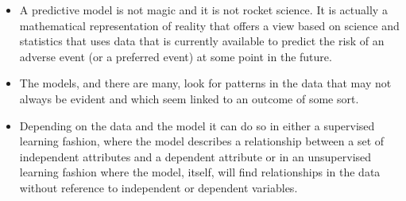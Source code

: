 \documentclass[PredictiveAnalytics101.tex]{subfiles}
\begin{document}
\begin{frame}
\Large
\begin{itemize}
\item A predictive model is not magic and it is not rocket science. It is actually a mathematical representation
of reality that offers a view based on science and statistics that uses data that is currently available to
predict the risk of an adverse event (or a preferred event) at some point in the future.
\item  The models, and
there are many, look for patterns in the data that may not always be evident and which seem linked to
an outcome of some sort. 
\end{itemize}	
\end{frame}


\begin{frame}
	\Large
\begin{itemize}
\item Depending on the data and the model it can do so in either a supervised
learning fashion, where the model describes a relationship between a set of independent attributes and
a dependent attribute or in an unsupervised learning fashion where the model, itself, will find
relationships in the data without reference to independent or dependent variables.
\end{itemize}	
\end{frame}
\end{document}
